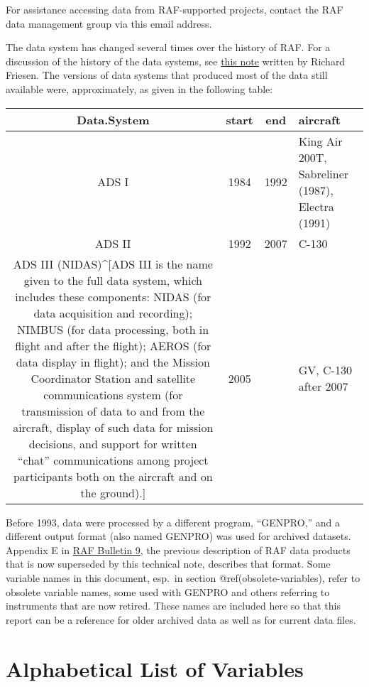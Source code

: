 \documentclass[
  english,
]{book}
\begin{document}
For assistance accessing data from RAF-supported projects, contact the
RAF data management group via this email address.

The data system has changed several times over the history of RAF. For a
discussion of the history of the data systems, see
\href{www/ADSHistory.pdf}{this note} written by Richard Friesen. The
versions of data systems that produced most of the data still available
were, approximately, as given in the following table:

\begin{table}
\centering
\begin{tabular}{c|c|c|l}
\hline
Data.System & start & end & aircraft\\
\hline
ADS I & 1984 & 1992 & King Air 200T, Sabreliner (1987), Electra (1991)\\
\hline
ADS II & 1992 & 2007 & C-130\\
\hline
ADS III (NIDAS)\textasciicircum{}[ADS III is the name given to the full data system, which includes these components: NIDAS (for data acquisition and recording); NIMBUS (for data processing, both in flight and after the flight); AEROS (for data display in flight); and the Mission Coordinator Station and satellite communications system (for transmission of data to and from the aircraft, display of such data for mission decisions, and support for written “chat” communications among project participants both on the aircraft and on the ground).] & 2005 &  & GV, C-130 after 2007\\
\hline
\end{tabular}
\end{table}

Before 1993, data were processed by a different program, ``GENPRO,'' and
a different output format (also named GENPRO) was used for archived
datasets. Appendix E in
\href{https://opensky.ucar.edu/islandora/object/archives\%3A8729}{RAF
Bulletin 9}, the previous description of RAF data products that is now
superseded by this technical note, describes that format. Some variable
names in this document, esp.~in section @ref(obsolete-variables), refer
to obsolete variable names, some used with GENPRO and others referring
to instruments that are now retired. These names are included here so
that this report can be a reference for older archived data as well as
for current data files.

\hypertarget{alphabetical-list-of-variables}{%
\section{Alphabetical List of
Variables}\label{alphabetical-list-of-variables}}
\end{document}
